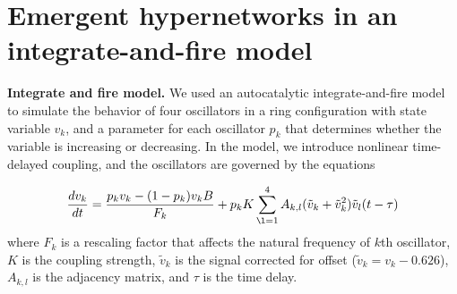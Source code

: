 \documentclass[12pt]{article}
\theoremstyle{plain}
\theoremstyle{definition}
\theoremstyle{remark}
\theoremstyle{remark}
\begin{document}
{


\section{Emergent hypernetworks in an  integrate-and-fire model}

\textbf{Integrate and fire model.} We used an autocatalytic integrate-and-fire model \cite{Kori2018} to simulate the
 behavior of four oscillators in a ring configuration with state variable $v_k$, and a parameter for each oscillator
  $p_k$ that determines whether the variable is increasing or decreasing. In the model, we introduce nonlinear 
  time-delayed coupling, and the oscillators are governed by the equations

\begin{equation}
\label{IF-equ}
\frac{dv_k}{dt} = \frac{p_{k}v_{k} - (1-p_{k})v_{k}B}{F_{k}} +p_{k}K \sum_{\l=1}^4 A_{k,l}(\tilde{v}_k+\tilde{v}_k^2)\tilde{v}_l(t-\tau)
\end{equation}
where $F_k$ is a rescaling factor that affects the natural frequency of $k$th oscillator, $K$ is the coupling strength, $\tilde{v}_k$ is the signal corrected for offset ($\tilde{v}_k=v_k-0.626$), $A_{k,l}$ is the adjacency matrix, and $\tau$ is the time delay.

}
\end{document}
